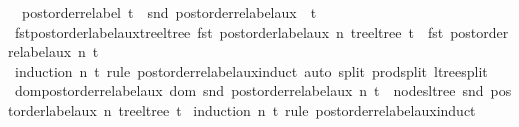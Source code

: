 \begin{isabellebody}
\ \ {\isachardoublequoteopen}postorder{\isacharunderscore}{\kern0pt}relabel\ t\ {\isacharequal}{\kern0pt}\ snd\ {\isacharparenleft}{\kern0pt}postorder{\isacharunderscore}{\kern0pt}relabel{\isacharunderscore}{\kern0pt}aux\ {}\ t{\isacharparenright}{\kern0pt}{\isachardoublequoteclose}\isanewline
\isanewline
{}\isamarkupfalse%
\ fst{\isacharunderscore}{\kern0pt}postorder{\isacharunderscore}{\kern0pt}label{\isacharunderscore}{\kern0pt}aux{\isacharunderscore}{\kern0pt}tree{\isacharunderscore}{\kern0pt}ltree{\isacharcolon}{\kern0pt}\ {\isachardoublequoteopen}fst\ {\isacharparenleft}{\kern0pt}postorder{\isacharunderscore}{\kern0pt}label{\isacharunderscore}{\kern0pt}aux\ n\ {\isacharparenleft}{\kern0pt}tree{\isacharunderscore}{\kern0pt}ltree\ t{\isacharparenright}{\kern0pt}{\isacharparenright}{\kern0pt}\ {\isacharequal}{\kern0pt}\ fst\ {\isacharparenleft}{\kern0pt}postorder{\isacharunderscore}{\kern0pt}relabel{\isacharunderscore}{\kern0pt}aux\ n\ t{\isacharparenright}{\kern0pt}{\isachardoublequoteclose}\isanewline
%
\isadelimproof
\ \ %
\endisadelimproof
%
\isatagproof
{}\isamarkupfalse%
\ {\isacharparenleft}{\kern0pt}induction\ n\ t\ rule{\isacharcolon}{\kern0pt}\ postorder{\isacharunderscore}{\kern0pt}relabel{\isacharunderscore}{\kern0pt}aux{\isachardot}{\kern0pt}induct{\isacharparenright}{\kern0pt}\ {\isacharparenleft}{\kern0pt}auto\ split{\isacharcolon}{\kern0pt}\ prod{\isachardot}{\kern0pt}split\ ltree{\isachardot}{\kern0pt}split{\isacharparenright}{\kern0pt}%
\endisatagproof
{\isafoldproof}%
%
\isadelimproof
\isanewline
%
\endisadelimproof
\isanewline
{}\isamarkupfalse%
\ dom{\isacharunderscore}{\kern0pt}postorder{\isacharunderscore}{\kern0pt}relabel{\isacharunderscore}{\kern0pt}aux{\isacharcolon}{\kern0pt}\ {\isachardoublequoteopen}dom\ {\isacharparenleft}{\kern0pt}snd\ {\isacharparenleft}{\kern0pt}postorder{\isacharunderscore}{\kern0pt}relabel{\isacharunderscore}{\kern0pt}aux\ n\ t{\isacharparenright}{\kern0pt}{\isacharparenright}{\kern0pt}\ {\isacharequal}{\kern0pt}\ nodes{\isacharunderscore}{\kern0pt}ltree\ {\isacharparenleft}{\kern0pt}snd\ {\isacharparenleft}{\kern0pt}postorder{\isacharunderscore}{\kern0pt}label{\isacharunderscore}{\kern0pt}aux\ n\ {\isacharparenleft}{\kern0pt}tree{\isacharunderscore}{\kern0pt}ltree\ t{\isacharparenright}{\kern0pt}{\isacharparenright}{\kern0pt}{\isacharparenright}{\kern0pt}{\isachardoublequoteclose}\isanewline
%
\isadelimproof
%
\endisadelimproof
%
\isatagproof
{}\isamarkupfalse%
\ {\isacharparenleft}{\kern0pt}induction\ n\ t\ rule{\isacharcolon}{\kern0pt}\ postorder{\isacharunderscore}{\kern0pt}relabel{\isacharunderscore}{\kern0pt}aux{\isachardot}{\kern0pt}induct{\isacharparenright}{\kern0pt}\isanewline

\end{isabellebody}
